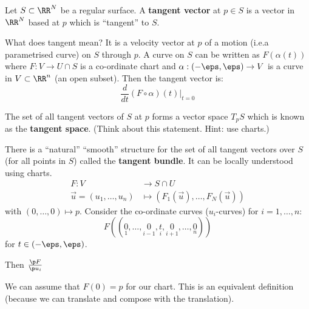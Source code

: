 \begin{defn}[informal]
  Let $S \subset \RR^N$ be a regular surface.
  A \textbf{tangent vector} at $p \in S$ is a vector in $\RR^N$ based at $p$ which is ``tangent'' to $S$.

  What does tangent mean?
  It is a velocity vector at $p$ of a motion (i.e.\@ a parametrised curve) on $S$ through $p$.
  A curve on $S$ can be written as $F(\alpha(t))$ where $F: V \to U \cap S$ is a co-ordinate chart and $\alpha: (-\eps,\eps) \to V$ is a curve in $V \subset \RR^n$ (an open subset).
  Then the tangent vector is:
  \[ \frac{d}{dt} \left( F \circ \alpha \right) (t) \Big|_{t=0} \]

  The set of all tangent vectors of $S$ at $p$ forms a vector space $T_pS$ which is known as the \textbf{tangent space}.
  (Think about this statement.
  Hint: use charts.)

  There is a ``natural'' ``smooth'' structure for the set of all tangent vectors over $S$ (for all points in $S$) called the \textbf{tangent bundle}.
  It can be locally understood using charts.
  \begin{align*}
    F: V &\to S \cap U \\
    \vec u = (u_1,\ldots,u_n) &\mapsto \left( F_1(\vec u),\ldots,F_N(\vec u) \right)
  \end{align*}
  with $(0,\ldots,0) \mapsto p$.
  Consider the co-ordinate curves ($u_i$-curves) for $i=1,\ldots,n$:
  \[ F\left( 
      ( \underset{1}{0}, \ldots, \underset{i-1}{0}, \underset{i}{t}, \underset{i+1}{0}, \ldots, \underset{n}{0} )
    \right)
  \]
  for $t \in (-\eps,\eps)$.
  
  Then $\frac{\p F}{\p u_i}$
\end{defn}

\begin{rmk}
  We can assume that $F(0)=p$ for our chart.
  This is an equivalent definition (because we can translate and compose with the translation).
\end{rmk}
